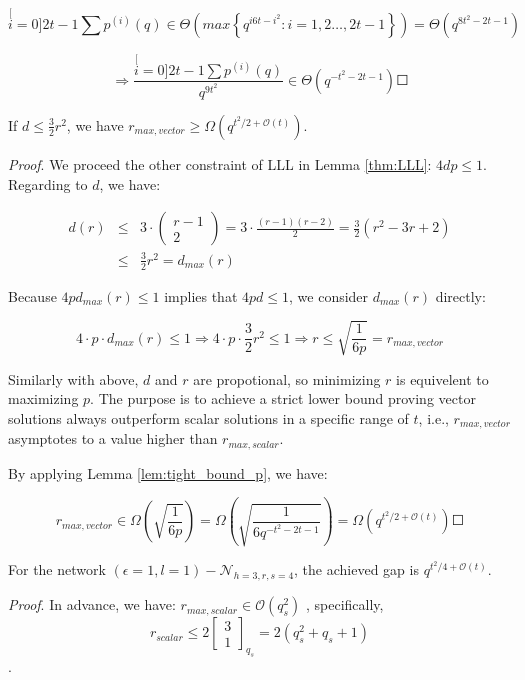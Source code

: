 \[
\stackrel[i=0]{2t-1}{\mathop{\sum}}p^{(i)}(q)\in\Theta\left(max\left\{ q^{i6t-i^{2}}:i=1,2\ldots,2t-1\right\} \right)=\Theta\left(q^{8t^{2}-2t-1}\right)
\]

\[
\Rightarrow\frac{\stackrel[i=0]{2t-1}{\mathop{\sum}}p^{(i)}(q)}{q^{9t^{2}}}\in\Theta\left(q^{-t^{2}-2t-1}\right)\Square
\]

\begin{lem}
If $d\leq\frac{3}{2}r^{2}$, we have $r_{max,vector}\geq\Omega\left(q^{t^{2}/2+\mathcal{O}\left(t\right)}\right)$.
\label{lem:lower_bound_r_max_vector}
\end{lem}
\textit{Proof}. We proceed the other constraint of LLL in Lemma \ref{thm:LLL}:
$4dp\leq1$. Regarding to $d$, we have:

\begin{eqnarray*}
d(r) & \leq & 3\cdot\left(\begin{array}{c}
r-1\\
2
\end{array}\right)=3\cdot\frac{\left(r-1\right)\left(r-2\right)}{2}=\frac{3}{2}\left(r^{2}-3r+2\right)\\
 & \leq & \frac{3}{2}r^{2}=d_{max}(r)
\end{eqnarray*}

Because $4pd_{max}(r)\leq1$ implies that $4pd\leq1$, we consider
$d_{max}(r)$ directly:

\[
4\cdot p\cdot d_{max}(r)\leq1\Rightarrow4\cdot p\cdot\frac{3}{2}r^{2}\leq1\Rightarrow r\leq\sqrt{\frac{1}{6p}}=r_{max,vector}
\]

Similarly with above, $d$ and $r$ are propotional, so minimizing
$r$ is equivelent to maximizing $p$. The purpose is to achieve a
strict lower bound proving vector solutions always outperform scalar
solutions in a specific range of $t$, i.e., $r_{max,vector}$ asymptotes
to a value higher than $r_{max,scalar}$.

By applying Lemma \ref{lem:tight_bound_p}, we have:

\[
r_{max,vector}\in\Omega\left(\sqrt{\frac{1}{6p}}\right)=\Omega\left(\sqrt{\frac{1}{6q^{-t^{2}-2t-1}}}\right)=\Omega\left(q^{t^{2}/2+\mathcal{O}\left(t\right)}\right)\Square
\]

\begin{thm}
For the network $\left(\epsilon=1,l=1\right)-\mathcal{N}_{h=3,r,s=4}$,
the achieved gap is $q^{t^{2}/4+\mathcal{O}(t)}$.
\end{thm}
\textit{Proof}. In advance, we have: $r_{max,scalar}\in\mathcal{O}\left(q_{s}^{2}\right)$
\cite{Wachter-Zeh:2018}, specifically, 
\begin{equation}
r_{scalar}\leq2\left[\begin{array}{c}
3\\
1
\end{array}\right]_{q_{s}}=2\left(q_{s}^{2}+q_{s}+1\right)\label{eq:r_scalar_max}
\end{equation}
. 


